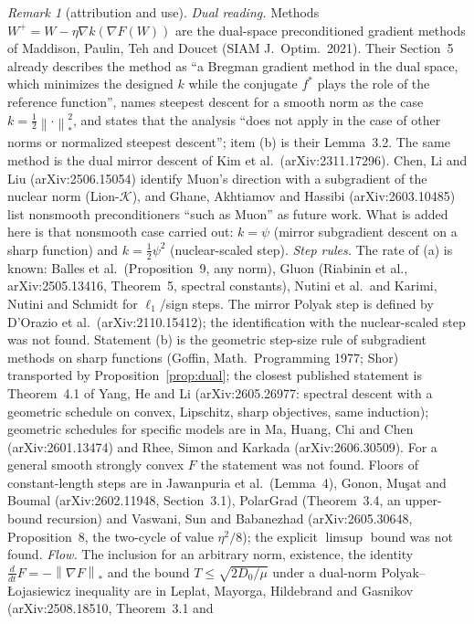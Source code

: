 \documentclass[11pt]{article}
\theoremstyle{definition}
\theoremstyle{remark}
\newtheorem{remark}[theorem]{Remark}
\newcommand{\norm}[1]{\left\|#1\right\|}
\begin{document}
\begin{remark}[attribution and use]\label{rem:dual}
\emph{Dual reading.} Methods $W^+=W-\eta\nabla k(\nabla F(W))$ are the dual-space preconditioned gradient methods of
Maddison, Paulin, Teh and Doucet (SIAM J.\ Optim.\ 2021). Their Section~5 already describes the method as ``a Bregman
gradient method in the dual space, which minimizes the designed $k$ while the conjugate $f^\ast$ plays the role of the
reference function'', names steepest descent for a smooth norm as the case $k=\frac12\norm\cdot_\ast^2$, and states that
the analysis ``does not apply in the case of other norms or normalized steepest descent''; item (b) is their Lemma~3.2.
The same method is the dual mirror descent of Kim et al.\ (arXiv:2311.17296). Chen, Li and Liu (arXiv:2506.15054) identify
Muon's direction with a subgradient of the nuclear norm (Lion-$\mathcal K$), and Ghane, Akhtiamov and Hassibi
(arXiv:2603.10485) list nonsmooth preconditioners ``such as Muon'' as future work. What is added here is that nonsmooth
case carried out: $k=\psi$ (mirror subgradient descent on a sharp function) and $k=\frac12\psi^2$ (nuclear-scaled step).
\emph{Step rules.} The rate of (a) is known: Balles et al.\ (Proposition~9, any norm), Gluon (Riabinin et al.,
arXiv:2505.13416, Theorem~5, spectral constants), Nutini et al.\ and Karimi, Nutini and Schmidt for $\ell_1$/sign steps.
The mirror Polyak step is defined by D'Orazio et al.\ (arXiv:2110.15412); the identification with the nuclear-scaled step
was not found. Statement (b) is the geometric step-size rule of subgradient methods on sharp functions (Goffin, Math.\
Programming 1977; Shor) transported by Proposition~\ref{prop:dual}; the closest published statement is Theorem~4.1 of Yang,
He and Li (arXiv:2605.26977: spectral descent with a geometric schedule on convex, Lipschitz, sharp objectives, same
induction); geometric schedules for specific models are in Ma, Huang, Chi and Chen (arXiv:2601.13474) and Rhee, Simon and
Karkada (arXiv:2606.30509). For a general smooth strongly convex $F$ the statement was not found. Floors of
constant-length steps are in Jawanpuria et al.\ (Lemma~4), Gonon, Mu\c{s}at and Boumal (arXiv:2602.11948, Section~3.1),
PolarGrad (Theorem~3.4, an upper-bound recursion) and Vaswani, Sun and Babanezhad (arXiv:2605.30648, Proposition~8, the
two-cycle of value $\eta^2/8$); the explicit $\limsup$ bound was not found. \emph{Flow.} The inclusion for an arbitrary
norm, existence, the identity $\frac d{dt}F=-\norm{\nabla F}_\ast$ and the bound $T\le\sqrt{2D_0/\mu}$ under a dual-norm
Polyak--\L{}ojasiewicz inequality are in Leplat, Mayorga, Hildebrand and Gasnikov (arXiv:2508.18510, Theorem~3.1 and

\end{remark}
\end{document}
